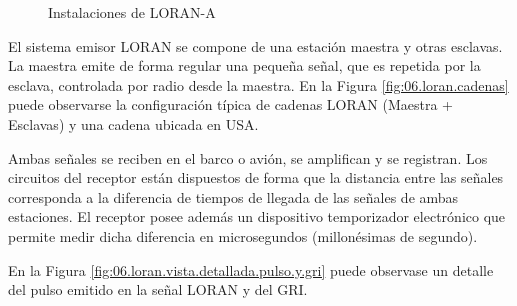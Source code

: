 \begin{figure}[!tbh]
  \centering
  \caption{Instalaciones de LORAN-A \protect\cite{Historia_LORAN} }
\end{figure}

 El sistema emisor LORAN se compone de una estaci\'on maestra y otras esclavas. La maestra emite de forma regular una peque\~na se\~nal, que es repetida por la esclava, controlada por radio desde la maestra.
En la Figura \ref{fig:06.loran.cadenas} puede observarse la configuraci\'on t\'ipica de cadenas LORAN (Maestra + Esclavas) y una cadena ubicada en USA.

 Ambas se\~nales se reciben en el barco o avi\'on, se amplifican y se registran. Los circuitos del receptor est\'an dispuestos de forma que la distancia entre las se\~nales corresponda a la diferencia de tiempos de llegada de las se\~nales de ambas estaciones. El receptor posee adem\'as un dispositivo temporizador electr\'onico que permite medir dicha diferencia en microsegundos (millon\'esimas de segundo). 

En la Figura \ref{fig:06.loran.vista.detallada.pulso.y.gri} puede observase un detalle del pulso emitido en la se\~nal LORAN y del \ac{GRI}.

